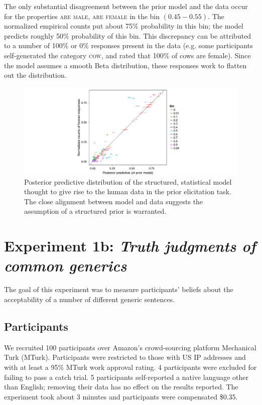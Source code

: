 \documentclass[10pt,letterpaper]{article}
\begin{document}
The only substantial disagreement between the prior model and the data occur for  the properties \textsc{are male, are female} in the bin $(0.45-0.55)$. 
The normalized empirical counts put about 75\% probability in this bin; the model predicts roughly 50\% probability of this bin. 
This discrepancy can be attributed to a number of 100\% or 0\% responses present in the data (e.g. some participants self-generated the category \textsc{cow}, and rated that 100\% of cows are female). 
Since the model assumes a smooth Beta distribution, these responses work to flatten out the distribution.


\begin{figure}
\centering
    \includegraphics[width=0.8\columnwidth]{postPred-priorModel.pdf}
    \caption{Posterior predictive distribution of the structured, statistical model thought to give rise to the human data in the prior elicitation task. The close alignment between model and data suggests the assumption of a structured prior is warranted.}
  \label{fig:pp-priorModel}
\end{figure}

\section{Experiment 1b: \emph{Truth judgments of common generics}}
\label{truthjudements:naturalcases}

The goal of this experiment was to measure participants' beliefs about the acceptability of a number of different generic sentences. 

\subsection{Participants}

We recruited 100 participants over Amazon's crowd-sourcing platform Mechanical Turk (MTurk).  
Participants were restricted to those with US IP addresses and with at least a 95\% MTurk work approval rating. 
4 participants were excluded for failing to pass a catch trial.
5 participants self-reported a native language other than English; removing their data has no effect on the results reported. 
The experiment took about 3 minutes and participants were compensated \$0.35.
\end{document}
